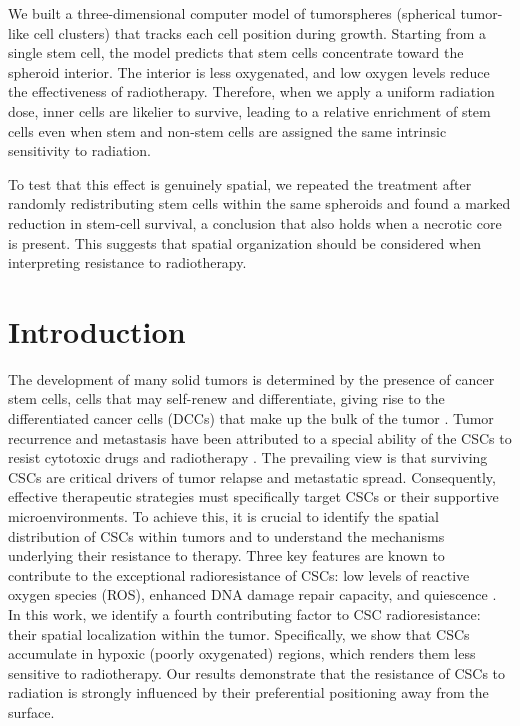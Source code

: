 \documentclass[10pt,letterpaper]{article}
\begin{document}
We built a three-dimensional computer model of tumorspheres (spherical tumor-like cell clusters) that tracks each cell position during growth. Starting from a single stem cell, the model predicts that stem cells concentrate toward the spheroid interior. The interior is less oxygenated, and low oxygen levels reduce the effectiveness of radiotherapy. Therefore, when we apply a uniform radiation dose, inner cells are likelier to survive, leading to a relative enrichment of stem cells even when stem and non-stem cells are assigned the same intrinsic sensitivity to radiation.

To test that this effect is genuinely spatial, we repeated the treatment after randomly redistributing stem cells within the same spheroids and found a marked reduction in stem-cell survival, a conclusion that also holds when a necrotic core is present. This suggests that spatial organization should be considered when interpreting resistance to radiotherapy.

\linenumbers

\section*{Introduction}

The development of many solid tumors is determined by the presence of cancer stem cells, cells that may self-renew and differentiate, giving rise to the differentiated cancer cells (DCCs) that make up the bulk of the tumor \cite{baccelli2012evolving,batlle2017cancer,jagust2019metabolism}. Tumor recurrence and metastasis have been attributed to a special ability of the CSCs to resist cytotoxic drugs and radiotherapy \cite{kreso2014self,batlle2017cancer,prieto2017drug,la2018explaining,malta2018machine,feng2020,bhattacharya2020smar1}. The prevailing view is that surviving CSCs are critical drivers of tumor relapse and metastatic spread. Consequently, effective therapeutic strategies must specifically target CSCs or their supportive microenvironments. To achieve this, it is crucial to identify the spatial distribution of CSCs within tumors and to understand the mechanisms underlying their resistance to therapy. Three key features are known to contribute to the exceptional radioresistance of CSCs: low levels of reactive oxygen species (ROS), enhanced DNA damage repair capacity, and quiescence \cite{Bao2006, Skvortsova2015, Arnold2020}. In this work, we identify a fourth contributing factor to CSC radioresistance: their spatial localization within the tumor. Specifically, we show that CSCs accumulate in hypoxic (poorly oxygenated) regions, which renders them less sensitive to radiotherapy. Our results demonstrate that the resistance of CSCs to radiation is strongly influenced by their preferential positioning away from the surface. 
\end{document}
